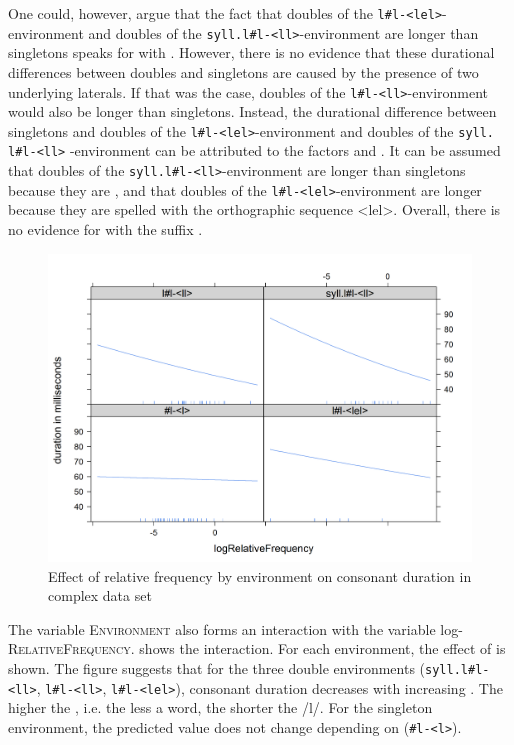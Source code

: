One could, however, argue that the fact that doubles of the \texttt{l\#l-<lel>}- environment and doubles of the \texttt{syll.l\#l-<ll>}-environment are  longer than singletons speaks for  with . However, there is no evidence that these durational differences between doubles and singletons are caused by the presence of two underlying laterals. If that was the case, doubles of the \texttt{l\#l-<ll>}-environment would also be longer than singletons. 
Instead, the durational difference between singletons and doubles of the \texttt{l\#l-<lel>}-environment and doubles of the \texttt{syll. l\#l-<ll>} -environment can be attributed to the factors  and . It can be assumed that doubles of the  \texttt{syll.l\#l-<ll>}-environment are longer than singletons because they are , and that doubles of the  \texttt{l\#l-<lel>}-environment are longer because they are spelled with the orthographic sequence <lel>. 
 Overall, there is no evidence for  with the suffix .


\begin{figure}
	
	\includegraphics [scale=0.5] {images/Experiment/LyModelInterRelFreqEnv}
	\caption{Effect of relative frequency by environment on consonant duration in complex data set}
	\label{fig:Rel Env lyComplex experiment}
	
\end{figure}



The variable \textsc{Environment} also forms an interaction with the variable log- \textsc{RelativeFrequency}.  shows the interaction. For each environment, the effect of  is shown. 
The figure suggests that for the three double environments (\texttt{syll.l\#l- <ll>}, \texttt{l\#l-<ll>}, \texttt{l\#l-<lel>}), consonant duration decreases with increasing . The higher the , i.e. the less  a word, the shorter the /l/. For the singleton environment, the predicted value does not change depending on  (\texttt{\#l-<l>}).




